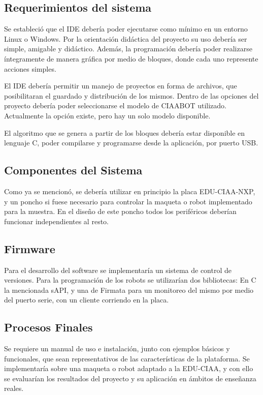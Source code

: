 \subsection{Requerimientos del sistema}
\label{subsec:requerimientosSistema}
Se estableció que el IDE debería poder ejecutarse como mínimo en un entorno Linux o Windows. Por la orientación didáctica del proyecto su uso debería ser simple, amigable y didáctico. Además, la programación debería poder realizarse íntegramente de manera gráfica por medio de bloques, donde cada uno represente acciones simples.

El IDE debería permitir un manejo de proyectos en forma de archivos, que posibilitaran el guardado y distribución de los mismos. Dentro de las opciones del proyecto debería poder seleccionarse el modelo de CIAABOT utilizado. Actualmente la opción existe, pero hay un solo modelo disponible.

El algoritmo que se genera a partir de los bloques debería estar disponible en lenguaje C, poder compilarse y programarse desde la aplicación, por puerto USB.

\subsection{Componentes del Sistema}
\label{subsec:componentesSistema}
Como ya se mencionó, se debería utilizar en principio la placa EDU-CIAA-NXP, y un poncho si fuese necesario para controlar la maqueta o robot implementado para la muestra. En el diseño de este poncho todos los periféricos deberían funcionar independientes al resto.

\subsection{Firmware}
\label{subsec:firmware}
Para el desarrollo del software se implementaría un sistema de control de versiones. Para la programación de los robots se utilizarían dos bibliotecas: En C la mencionada sAPI, y una de Firmata para un monitoreo del mismo por medio del puerto serie, con un cliente corriendo en la placa.

\subsection{Procesos Finales}
\label{subsec:procesosFinales}
Se requiere un manual de uso e instalación, junto con ejemplos básicos y funcionales, que sean representativos de las características de la plataforma. Se implementaría sobre una maqueta o robot adaptado a la EDU-CIAA, y con ello se evaluarían los resultados del proyecto y su aplicación en ámbitos de enseñanza reales.

